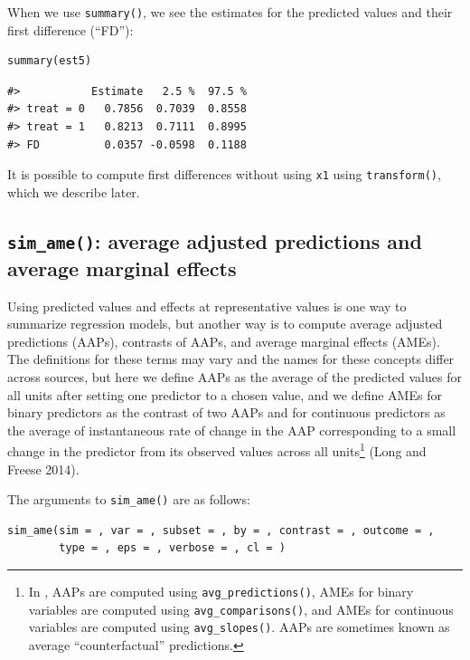 When we use \texttt{summary()}, we see the estimates for the predicted values and their first difference (``FD''):

\begin{verbatim}
summary(est5)
\end{verbatim}

\begin{verbatim}
#>           Estimate   2.5 %  97.5 %
#> treat = 0   0.7856  0.7039  0.8558
#> treat = 1   0.8213  0.7111  0.8995
#> FD          0.0357 -0.0598  0.1188
\end{verbatim}

It is possible to compute first differences without using \texttt{x1} using \texttt{transform()}, which we describe later.

\subsection{\texorpdfstring{\texttt{sim\_ame()}: average adjusted predictions and average marginal effects}{sim\_ame(): average adjusted predictions and average marginal effects}}\label{sim_ame-average-adjusted-predictions-and-average-marginal-effects}

Using predicted values and effects at representative values is one way to summarize regression models, but another way is to compute average adjusted predictions (AAPs), contrasts of AAPs, and average marginal effects (AMEs). The definitions for these terms may vary and the names for these concepts differ across sources, but here we define AAPs as the average of the predicted values for all units after setting one predictor to a chosen value, and we define AMEs for binary predictors as the contrast of two AAPs and for continuous predictors as the average of instantaneous rate of change in the AAP corresponding to a small change in the predictor from its observed values across all units\footnote{In , AAPs are computed using \texttt{avg\_predictions()}, AMEs for binary variables are computed using \texttt{avg\_comparisons()}, and AMEs for continuous variables are computed using \texttt{avg\_slopes()}. AAPs are sometimes known as average ``counterfactual'' predictions.} (Long and Freese 2014).

The arguments to \texttt{sim\_ame()} are as follows:

\begin{verbatim}
sim_ame(sim = , var = , subset = , by = , contrast = , outcome = ,
        type = , eps = , verbose = , cl = )
\end{verbatim}


